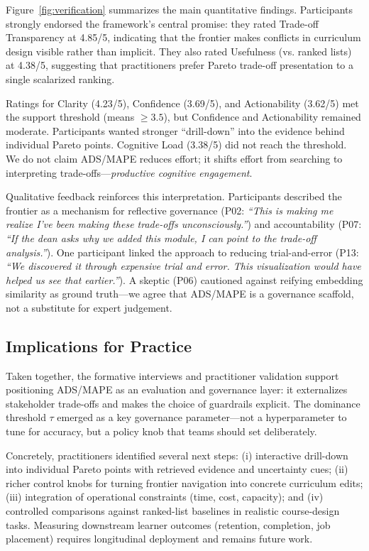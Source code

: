 \documentclass[sigconf,review]{acmart}
\newcommand{\ADS}{\textsc{ADS}\xspace}
\newcommand{\MAPE}{\textsc{MAPE}\xspace}
\begin{document}


Figure~\ref{fig:verification} summarizes the main quantitative findings. Participants strongly endorsed the framework's central promise: they rated {Trade-off Transparency} at {4.85/5}, indicating that the frontier makes conflicts in curriculum design visible rather than implicit. They also rated {Usefulness (vs. ranked lists)} at {4.38/5}, suggesting that practitioners prefer Pareto trade-off presentation to a single scalarized ranking.

Ratings for Clarity (4.23/5), Confidence (3.69/5), and Actionability (3.62/5) met the support threshold (means $\ge 3.5$), but Confidence and Actionability remained moderate. Participants wanted stronger ``drill-down'' into the evidence behind individual Pareto points. Cognitive Load (3.38/5) did not reach the threshold. We do not claim \ADS/\MAPE reduces effort; it shifts effort from searching to interpreting trade-offs---\emph{productive cognitive engagement}.

Qualitative feedback reinforces this interpretation. Participants described the frontier as a mechanism for reflective governance (P02: \textit{``This is making me realize I've been making these trade-offs unconsciously.''}) and accountability (P07: \textit{``If the dean asks why we added this module, I can point to the trade-off analysis.''}). One participant linked the approach to reducing trial-and-error (P13: \textit{``We discovered it through expensive trial and error. This visualization would have helped us see that earlier.''}). A skeptic (P06) cautioned against reifying embedding similarity as ground truth---we agree that \ADS/\MAPE is a governance scaffold, not a substitute for expert judgement.

\subsection{Implications for Practice}
Taken together, the formative interviews and practitioner validation support positioning \ADS/\MAPE as an evaluation and governance layer: it externalizes stakeholder trade-offs and makes the choice of guardrails explicit. The dominance threshold $\tau$ emerged as a key governance parameter---not a hyperparameter to tune for accuracy, but a policy knob that teams should set deliberately.

Concretely, practitioners identified several next steps: (i) interactive drill-down into individual Pareto points with retrieved evidence and uncertainty cues; (ii) richer control knobs for turning frontier navigation into concrete curriculum edits; (iii) integration of operational constraints (time, cost, capacity); and (iv) controlled comparisons against ranked-list baselines in realistic course-design tasks. Measuring downstream learner outcomes (retention, completion, job placement) requires longitudinal deployment and remains future work.
\end{document}
